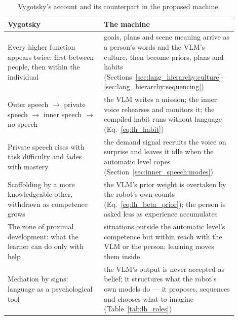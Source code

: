 \begin{table}[ht]
    \centering
    \small
    \begin{tabular}{|>{\raggedright\arraybackslash}p{0.4\linewidth}|>{\raggedright\arraybackslash}p{0.5\linewidth}|}
        \hline
        \textbf{Vygotsky} & \textbf{The machine} \\ \hline
        Every higher function appears twice: first between people, then within the individual
            & goals, plans and scene meaning arrive as a person's words and the VLM's culture, then become priors,
              plans and habits (Sections~\ref{sec:lang_hierarchy:culture}--\ref{sec:lang_hierarchy:sequencing}) \\ \hline
        Outer speech $\to$ private speech $\to$ inner speech $\to$ no speech
            & the VLM writes a mission; the inner voice rehearses and monitors it; the compiled habit runs without
              language (Eq.~\ref{eq:lh_habit}) \\ \hline
        Private speech rises with task difficulty and fades with mastery \cite{berk1992children}
            & the demand signal recruits the voice on surprise and leaves it idle when the automatic level copes
              (Section~\ref{sec:inner_speech:modes}) \\ \hline
        Scaffolding by a more knowledgeable other, withdrawn as competence grows \cite{wood1976role}
            & the VLM's prior weight is overtaken by the robot's own counts (Eq.~\ref{eq:lh_beta_prior}); the person
              is asked less as experience accumulates \\ \hline
        The zone of proximal development: what the learner can do only with help
            & situations outside the automatic level's competence but within reach with the VLM or the person;
              learning moves them inside \\ \hline
        Mediation by signs: language as a psychological tool
            & the VLM's output is never accepted as belief; it structures what the robot's own models do --- it
              proposes, sequences and chooses what to imagine (Table~\ref{tab:lh_roles}) \\ \hline
    \end{tabular}
    \caption{Vygotsky's account and its counterpart in the proposed machine.}
    \label{tab:vygotskian_mapping}
\end{table}

